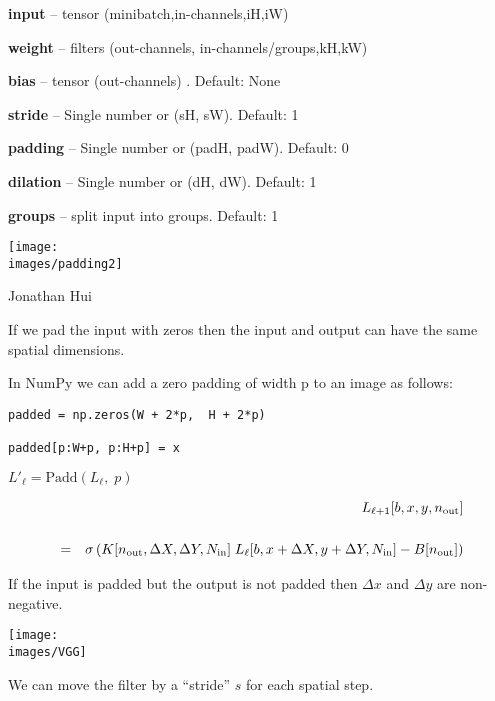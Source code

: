 {\bigskip
{\bf input} – tensor (minibatch,in-channels,iH,iW)

\medskip
{\bf weight} – filters (out-channels, in-channels/groups,kH,kW)

\medskip
{\bf bias} – tensor (out-channels) . Default: None

\medskip
{\bf stride} – Single number or (sH, sW). Default: 1

\medskip
{\bf padding} – Single number or (padH, padW). Default: 0

\medskip
{\bf dilation} – Single number or (dH, dW). Default: 1

\medskip
{\bf groups} – split input into groups. Default: 1


\centerline{\texttt{[image: \\images/padding2]}}
\centerline{\large Jonathan Hui}

\vfill
If we pad the input with zeros then the input and output can have the same spatial dimensions.


In NumPy we can add a zero padding of width p to an image as follows:

\vfill
\begin{verbatim}
padded = np.zeros(W + 2*p,  H + 2*p)

padded[p:W+p, p:H+p] = x
\end{verbatim}


$L'_{{\ell}} = \mathrm{Padd}(L_{{\ell}},\;p)$

\vfill
\begin{eqnarray*}
 & &  L_{{\ell+1}}[b,x,y,n_{\mathrm{out}}] \\
 \\
  & = &   \sigma\left(K[n_{\mathrm{out}},\Delta X, \Delta Y,N_{\mathrm{in}}]\; L_{{\ell}}[b,x + \Delta X, y + \Delta Y, N_{\mathrm{in}}] - B[n_{\mathrm{out}}]\right)
\end{eqnarray*}

\vfill
If the input is padded but the output is not padded then $\Delta x$ and $\Delta y$ are non-negative.


\centerline{\texttt{[image: \\images/VGG]}}


We can move the filter by a ``stride'' $s$ for each spatial step.


}

